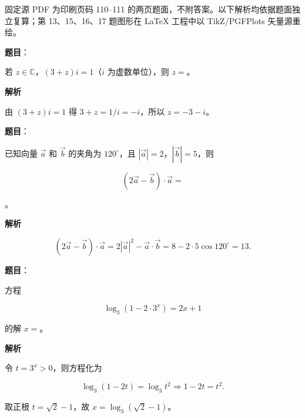 

\begin{gktip}
固定源 PDF 为印刷页码 110–111 的两页题面，不附答案。以下解析均依据题面独立复算；第 13、15、16、17 题图形在 LaTeX 工程中以 TikZ/PGFPlots 矢量源重绘。
\end{gktip}


\begin{answer}

\textbf{题目}：

若 $z\in\mathbb C$，$(3+z)i=1$（$i$ 为虚数单位），则 $z=$\gkblank{}。

\textbf{解析}

由 $(3+z)i=1$ 得 $3+z=1/i=-i$，所以 $z=-3-i$。


\end{answer}
\begin{answer}

\textbf{题目}：

已知向量 $\vec a$ 和 $\vec b$ 的夹角为 $120^\circ$，且 $|\vec a|=2$，$|\vec b|=5$，则

\nopagebreak[4]
\[
(2\vec a-\vec b)\cdot\vec a=
\]

\gkblank{}。

\textbf{解析}

\nopagebreak[4]
\[
(2\vec a-\vec b)\cdot\vec a
=2|\vec a|^2-\vec a\cdot\vec b
=8-2\cdot5\cos120^\circ
=13.
\]


\end{answer}
\begin{answer}

\textbf{题目}：

方程

\nopagebreak[4]
\[
\log_3(1-2\cdot3^x)=2x+1
\]

的解 $x=$\gkblank{}。

\textbf{解析}

令 $t=3^x>0$，则方程化为

\nopagebreak[4]
\[
\log_3(1-2t)=\log_3t^2
\Longrightarrow
1-2t=t^2.
\]

取正根 $t=\sqrt2-1$，故 $x=\log_3(\sqrt2-1)$。


\end{answer}

